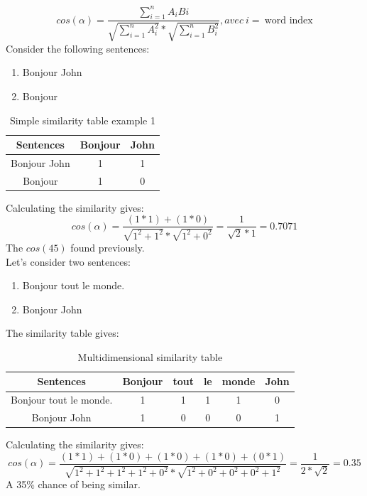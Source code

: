 \documentclass[a4paper, 14pt]{article}
\begin{document}
   	\[
   		cos(\alpha) = \frac{\sum_{i=1}^{n}A_{i}B{i}}{\sqrt{\sum_{i=1}^{n}A_{i}^{2}} * \sqrt{\sum_{i=1}^{n}B_{i}^{2}}}, avec \ i = \  \text{word index}
   	\]
   	Consider the following sentences:
   	\begin{enumerate}
   		\item Bonjour John
   		\item Bonjour
   	\end{enumerate}
   	 \begin{table}[H]
   		\centering
   		\begin{tabular}{|c|c|c|}
   			\hline
   			\textbf{Sentences} & \textbf{Bonjour} & \textbf{John} \\
   			\hline
   			Bonjour John & 1 & 1 \\
   			Bonjour  & 1 & 0 \\
   			\hline
   		\end{tabular}
   		\caption{Simple similarity table example 1}
   		\label{tab:similitude}
   	\end{table}
   	Calculating the similarity gives:
   	\[
   		cos(\alpha) = \frac{(1*1) + (1*0)}{\sqrt{1^{2} + 1^{2}} * \sqrt{1^{2} + 0^{2}}} = \frac{1}{\sqrt{2} * 1} = 0.7071
   	\]
   	The $cos(45)$ found previously.\\
   	Let's consider two sentences:
  	\begin{enumerate}
  		\item Bonjour tout le monde.
  		\item Bonjour John
  	\end{enumerate}
  	The similarity table gives:
  	\begin{table}[H]
  		\centering
  		\begin{tabular}{|c|c|c|c|c|c|}
  			\hline
  			\textbf{Sentences} & \textbf{Bonjour} & \textbf{tout} & \textbf{le} & \textbf{monde} & \textbf{John}\\
  			\hline
  			Bonjour tout le monde. & 1 & 1 & 1 & 1 & 0 \\
  			Bonjour  John & 1 & 0 & 0 & 0 & 1 \\
  			\hline
  		\end{tabular}
  		\caption{Multidimensional similarity table}
  		\label{tab:similitudecomplexe}
  	\end{table}
	Calculating the similarity gives:
	\[
		cos(\alpha) = \frac{(1*1) + (1*0) + (1*0) + (1*0) + (0*1)}{\sqrt{1^{2} + 1^{2} +  1^{2} +  1^{2} + 0^{2}} * \sqrt{1^{2} + 0^{2} + 0^{2} + 0^{2} + 1^{2}}} = \frac{1}{2 * \sqrt{2}} = 0.35
	\]
	A 35\% chance of being similar.
\end{document}
